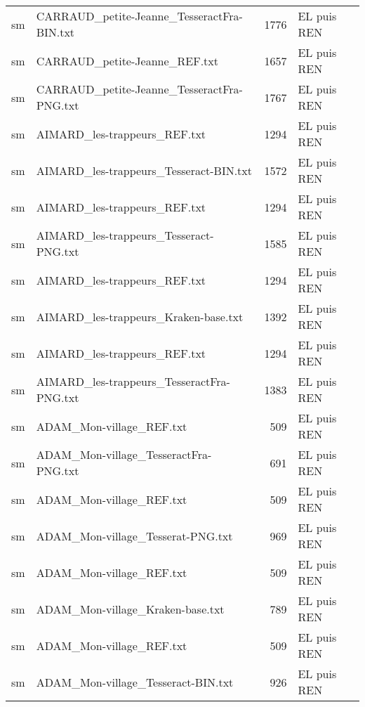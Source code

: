 \begin{tabular}{llrl}
    sm &         CARRAUD\_petite-Jeanne\_TesseractFra-BIN.txt &                  1776 & EL puis REN \\
    sm &                      CARRAUD\_petite-Jeanne\_REF.txt &                  1657 & EL puis REN \\
    sm &         CARRAUD\_petite-Jeanne\_TesseractFra-PNG.txt &                  1767 & EL puis REN \\
    sm &                       AIMARD\_les-trappeurs\_REF.txt &                  1294 & EL puis REN \\
    sm &             AIMARD\_les-trappeurs\_Tesseract-BIN.txt &                  1572 & EL puis REN \\
    sm &                       AIMARD\_les-trappeurs\_REF.txt &                  1294 & EL puis REN \\
    sm &             AIMARD\_les-trappeurs\_Tesseract-PNG.txt &                  1585 & EL puis REN \\
    sm &                       AIMARD\_les-trappeurs\_REF.txt &                  1294 & EL puis REN \\
    sm &               AIMARD\_les-trappeurs\_Kraken-base.txt &                  1392 & EL puis REN \\
    sm &                       AIMARD\_les-trappeurs\_REF.txt &                  1294 & EL puis REN \\
    sm &          AIMARD\_les-trappeurs\_TesseractFra-PNG.txt &                  1383 & EL puis REN \\
    sm &                           ADAM\_Mon-village\_REF.txt &                   509 & EL puis REN \\
    sm &              ADAM\_Mon-village\_TesseractFra-PNG.txt &                   691 & EL puis REN \\
    sm &                           ADAM\_Mon-village\_REF.txt &                   509 & EL puis REN \\
    sm &                  ADAM\_Mon-village\_Tesserat-PNG.txt &                   969 & EL puis REN \\
    sm &                           ADAM\_Mon-village\_REF.txt &                   509 & EL puis REN \\
    sm &                   ADAM\_Mon-village\_Kraken-base.txt &                   789 & EL puis REN \\
    sm &                           ADAM\_Mon-village\_REF.txt &                   509 & EL puis REN \\
    sm &                 ADAM\_Mon-village\_Tesseract-BIN.txt &                   926 & EL puis REN \\

\end{tabular}

